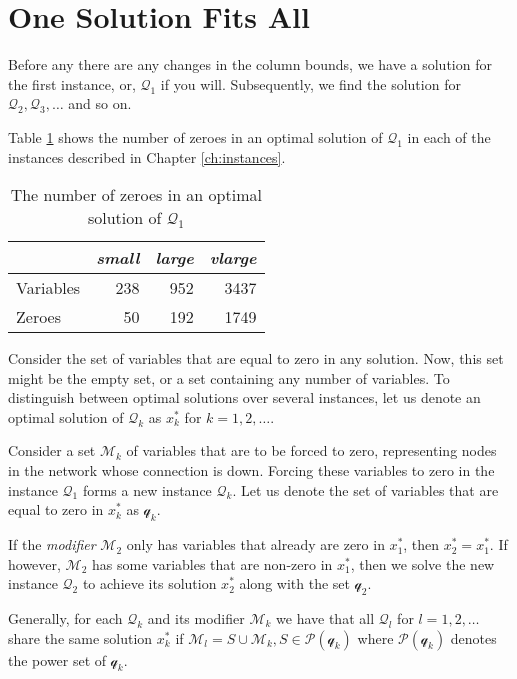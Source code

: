 \section{One Solution Fits All}
Before any there are any changes in the column bounds, we have a solution for
the first instance, or, $\mathcal{Q}_1$ if you will. Subsequently, we find
the solution for $\mathcal{Q}_2, \mathcal{Q}_3, \ldots$ and so on.

Table \ref{table:zeroes} shows the number of zeroes in an optimal solution of
$\mathcal{Q}_1$ in each of the instances described in Chapter
\ref{ch:instances}. 
\begin{table}
    \centering
    \caption{The number of zeroes in an optimal solution of $\mathcal{Q}_1$} 
    \begin{tabular}{lrrr}
              & \textit{small} & \textit{large} & \textit{vlarge} \\\hline
    Variables & 238            & 952            & 3437 \\
    Zeroes    & 50             & 192            & 1749
    \end{tabular}
    \label{table:zeroes}
\end{table}

Consider the set of variables that are equal to zero in any solution. Now, this
set might be the empty set, or a set containing any number of variables.
To distinguish between optimal solutions over several instances, let us denote
an optimal solution of $\mathcal{Q}_k$ as $x_k^*$ for $k=1,2,\ldots$.

Consider a set $\mathcal{M}_k$ of variables that are to be forced to
zero, representing nodes in the network whose connection is down. Forcing
these variables to zero in the instance $\mathcal{Q}_1$ forms a new instance
$\mathcal{Q}_k$. Let us denote the set of variables that are equal to zero in
$x_k^*$ as $\mathcal{q}_k$.

If the \emph{modifier} $\mathcal{M}_2$ only has variables
that already are zero in $x^*_1$, then $x^*_2 = x^*_1$. If however,
$\mathcal{M}_2$ has some variables that are non-zero in $x^*_1$, then we
solve the new instance $\mathcal{Q}_2$ to achieve its solution $x^*_2$
along with the set $\mathcal{q}_2$.

Generally, for each $\mathcal{Q}_k$ and its modifier $\mathcal{M}_k$ we
have that all $\mathcal{Q}_l$ for $l=1,2,\ldots$ share the same solution
$x_k^*$ if $\mathcal{M}_l = S \cup \mathcal{M}_k, S \in
\mathcal{P}(\mathcal{q}_k)$ where $\mathcal{P}(\mathcal{q}_k)$ denotes the
power set of $\mathcal{q}_k$.

